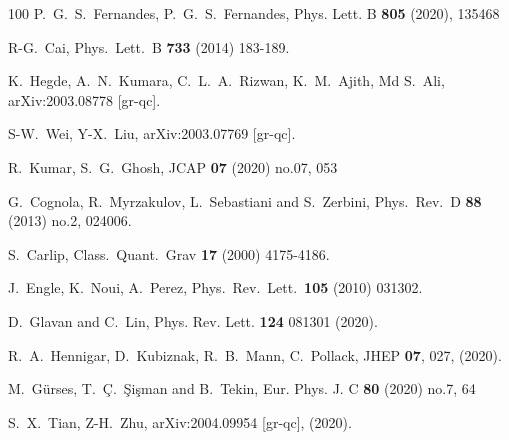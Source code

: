 \documentclass[aps,prd,preprint,nofootinbib]{revtex4-1}
\begin{document}
\begin{thebibliography}{100}
 P.~G.~S.~Fernandes,
P.~G.~S.~Fernandes,
Phys. Lett. B \textbf{805} (2020), 135468

 R-G.~Cai,
  Phys.\ Lett.\ B {\bf 733} (2014) 183-189.

 K.~Hegde, A.~N.~Kumara, C.~L.~A.~Rizwan, K.~M.~Ajith, Md S.~Ali,
  arXiv:2003.08778 [gr-qc].

 S-W.~Wei, Y-X.~Liu,
  arXiv:2003.07769 [gr-qc].

 R.~Kumar, S.~G.~Ghosh,
JCAP \textbf{07} (2020) no.07, 053

 G.~Cognola, R.~Myrzakulov, L.~Sebastiani and S.~Zerbini,
  Phys.\ Rev.\ D {\bf 88} (2013) no.2,  024006.

 S.~Carlip,
Class.\ Quant.\ Grav {\bf 17} (2000) 4175-4186.

 J.~Engle, K.~Noui, A.~Perez,
Phys.\ Rev.\ Lett.\ {\bf 105} (2010) 031302.

 D.~Glavan and C.~Lin,
 Phys. Rev. Lett. {\bf124} 081301 (2020).

 R.~A.~Hennigar, D.~Kubiznak, R.~B.~Mann, C.~Pollack,
JHEP {\bf 07}, 027, (2020).

 M.~G\"urses, T.~\c{C}.~\c{S}i\c{s}man and B.~Tekin,
Eur. Phys. J. C \textbf{80} (2020) no.7, 64

 S.~X.~Tian, Z-H.~Zhu,
arXiv:2004.09954 [gr-qc], (2020).


\end{thebibliography}
\end{document}
